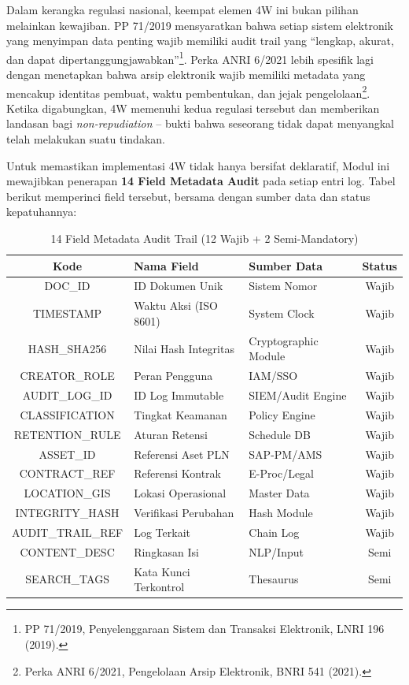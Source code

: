 \documentclass[12pt,a4paper]{report}
\begin{document}
Dalam kerangka regulasi nasional, keempat elemen 4W ini bukan pilihan melainkan kewajiban. PP 71/2019 mensyaratkan bahwa setiap sistem elektronik yang menyimpan data penting wajib memiliki audit trail yang ``lengkap, akurat, dan dapat dipertanggungjawabkan''\footnote{PP 71/2019, Penyelenggaraan Sistem dan Transaksi Elektronik, LNRI 196 (2019).}. Perka ANRI 6/2021 lebih spesifik lagi dengan menetapkan bahwa arsip elektronik wajib memiliki metadata yang mencakup identitas pembuat, waktu pembentukan, dan jejak pengelolaan\footnote{Perka ANRI 6/2021, Pengelolaan Arsip Elektronik, BNRI 541 (2021).}. Ketika digabungkan, 4W memenuhi kedua regulasi tersebut dan memberikan landasan bagi \textit{non-repudiation} -- bukti bahwa seseorang tidak dapat menyangkal telah melakukan suatu tindakan.

Untuk memastikan implementasi 4W tidak hanya bersifat deklaratif, Modul ini mewajibkan penerapan \textbf{14 Field Metadata Audit} pada setiap entri log. Tabel berikut memperinci field tersebut, bersama dengan sumber data dan status kepatuhannya:

\begin{table}[htbp]
\centering
\small
\caption{14 Field Metadata Audit Trail (12 Wajib + 2 Semi-Mandatory)}
\begin{tabularx}{\textwidth}{@{} c >{\raggedright\arraybackslash}X >{\raggedright\arraybackslash}X c @{}}
\toprule
\textbf{Kode} & \textbf{Nama Field} & \textbf{Sumber Data} & \textbf{Status} \\
\midrule
DOC\_ID & ID Dokumen Unik & Sistem Nomor & Wajib \\
TIMESTAMP & Waktu Aksi (ISO 8601) & System Clock & Wajib \\
HASH\_SHA256 & Nilai Hash Integritas & Cryptographic Module & Wajib \\
CREATOR\_ROLE & Peran Pengguna & IAM/SSO & Wajib \\
AUDIT\_LOG\_ID & ID Log Immutable & SIEM/Audit Engine & Wajib \\
CLASSIFICATION & Tingkat Keamanan & Policy Engine & Wajib \\
RETENTION\_RULE & Aturan Retensi & Schedule DB & Wajib \\
ASSET\_ID & Referensi Aset PLN & SAP-PM/AMS & Wajib \\
CONTRACT\_REF & Referensi Kontrak & E-Proc/Legal & Wajib \\
LOCATION\_GIS & Lokasi Operasional & Master Data & Wajib \\
INTEGRITY\_HASH & Verifikasi Perubahan & Hash Module & Wajib \\
AUDIT\_TRAIL\_REF & Log Terkait & Chain Log & Wajib \\
CONTENT\_DESC & Ringkasan Isi & NLP/Input & Semi \\
SEARCH\_TAGS & Kata Kunci Terkontrol & Thesaurus & Semi \\
\bottomrule
\end{tabularx}
\end{table}
\end{document}
